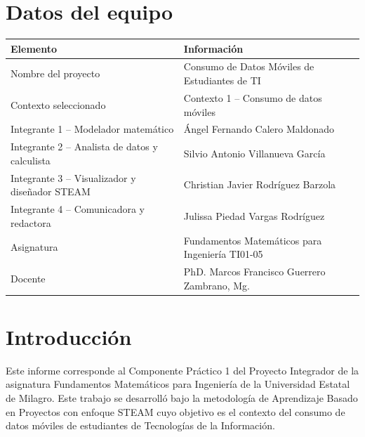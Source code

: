 \documentclass[12pt,a4paper]{article}
\begin{document}
	\begin{center}
		\singlespacing
		
		\vspace*{2cm}
		\section*{Datos del equipo}
		
		\begin{table}[H]
			\centering
			\renewcommand{\arraystretch}{1.4}
			\begin{tabular}{|p{6cm}|p{8cm}|}
				\hline
				\rowcolor{azulclaro}
				\textbf{Elemento} & \textbf{Información} \\ \hline
				Nombre del proyecto & Consumo de Datos Móviles de Estudiantes de TI \\ \hline
				Contexto seleccionado & Contexto 1 -- Consumo de datos móviles \\ \hline
				Integrante 1 -- Modelador matemático & Ángel Fernando Calero Maldonado \\ \hline
				Integrante 2 -- Analista de datos y calculista & Silvio Antonio Villanueva García \\ \hline
				Integrante 3 -- Visualizador y diseñador STEAM & Christian Javier Rodríguez Barzola \\ \hline
				Integrante 4 -- Comunicadora y redactora & Julissa Piedad Vargas Rodríguez \\ \hline
				Asignatura & Fundamentos Matemáticos para Ingeniería TI01-05 \\ \hline
				Docente & PhD. Marcos Francisco Guerrero Zambrano, Mg. \\ \hline
			\end{tabular}
		\end{table}
		
		\newpage
		\tableofcontents
		\newpage
		
		\section{Introducción}
		
		Este informe corresponde al Componente Práctico 1 del Proyecto Integrador de la asignatura Fundamentos Matemáticos para Ingeniería de la Universidad Estatal de Milagro. Este trabajo se desarrolló  bajo la metodología de Aprendizaje Basado en Proyectos con enfoque STEAM cuyo objetivo es el contexto del consumo de datos móviles de estudiantes de Tecnologías de la Información.
		

\end{center}
\end{document}
